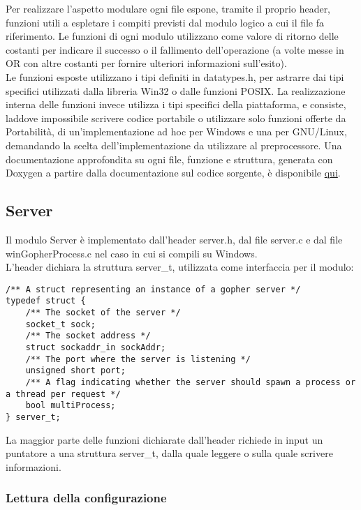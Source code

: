 \documentclass{article}
\begin{document}
Per realizzare l'aspetto modulare ogni file espone, tramite il proprio header, funzioni utili a espletare
i compiti previsti dal modulo logico a cui il file fa riferimento. Le funzioni di ogni modulo
utilizzano come valore di ritorno delle costanti per indicare il successo o il fallimento dell'operazione (a volte
messe in OR con altre costanti per fornire ulteriori informazioni sull'esito).
\\Le funzioni esposte utilizzano i tipi definiti in datatypes.h, per astrarre dai tipi specifici utilizzati
dalla libreria Win32 o dalle funzioni POSIX. La realizzazione interna delle funzioni invece
 utilizza i tipi specifici della piattaforma, e consiste, laddove impossibile scrivere codice portabile o utilizzare solo funzioni offerte da Portabilità,
 di un'implementazione ad hoc per Windows e una per GNU/Linux, demandando la scelta dell'implementazione
da utilizzare al preprocessore.
Una documentazione approfondita su ogni file, funzione e struttura, generata con Doxygen a partire dalla 
documentazione sul codice sorgente, è disponibile \href{html/index.html}{qui}. 

\subsection{Server}
Il modulo Server è implementato dall'header server.h, dal file server.c e dal file winGopherProcess.c 
nel caso in cui si compili su Windows.\\
L'header dichiara la struttura server\_t, utilizzata come interfaccia per il modulo:
\begin{lstlisting}
/** A struct representing an instance of a gopher server */
typedef struct {
    /** The socket of the server */
    socket_t sock;
    /** The socket address */
    struct sockaddr_in sockAddr;
    /** The port where the server is listening */
    unsigned short port;
    /** A flag indicating whether the server should spawn a process or a thread per request */
    bool multiProcess;
} server_t;
\end{lstlisting}
La maggior parte delle funzioni dichiarate dall'header richiede in input
un puntatore a una struttura server\_t, dalla quale leggere o sulla quale scrivere informazioni.

\subsubsection{Lettura della configurazione}
\end{document}
